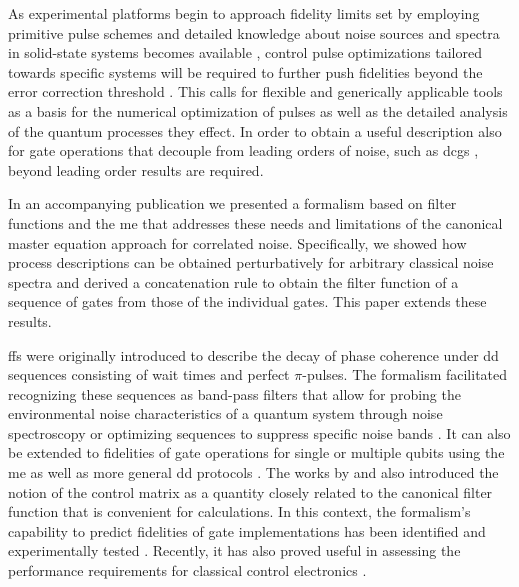 As experimental platforms begin to approach fidelity limits set by employing primitive pulse schemes \cite{Veldhorst2014,Debnath2016,Yoneda2018} and detailed knowledge about noise sources and spectra in solid-state systems becomes available \cite{Dial2013,Quintana2017,Malinowski2017spectroscopy}, control pulse optimizations tailored towards specific systems will be required to further push fidelities beyond the error correction threshold \cite{Barends2014,Blume-kohout2017}. This calls for flexible and generically applicable tools as a basis for the numerical optimization of pulses as well as the detailed analysis of the quantum processes they effect. In order to obtain a useful description also for gate operations that decouple from leading orders of noise, such as \glspl{dcg} \cite{Khodjasteh2009}, beyond leading order results are required.

In an accompanying publication \cite{Cerfontaine2021} we presented a formalism based on filter functions and the \gls{me} that addresses these needs and limitations of the canonical master equation approach for correlated noise. Specifically, we showed how process descriptions can be obtained perturbatively for arbitrary classical noise spectra and derived a concatenation rule to obtain the filter function of a sequence of gates from those of the individual gates. This paper extends these results.

\Glspl{ff} were originally introduced to describe the decay of phase coherence under \gls{dd} sequences \cite{Kofman2001,Martinis2003,Uhrig2007,Cywinski2008} consisting of wait times and perfect $\pi$-pulses. The formalism facilitated recognizing these sequences as band-pass filters that allow for probing the environmental noise characteristics of a quantum system through noise spectroscopy \cite{Alvarez2011,Bylander2011,Paz-Silva2017,Malinowski2017spectroscopy} or optimizing sequences to suppress specific noise bands \cite{Biercuk2009,Uys2009,Soare2014,Malinowski2017}. It can also be extended to fidelities of gate operations for single \cite{Green2012,Green2013} or multiple \cite{Gungordu2018,Ball2020} qubits using the \gls{me} \cite{Magnus1954,Blanes2009} as well as more general \gls{dd} protocols \cite{Paz-Silva2014}. The works by \citeauthor{Green2013} and \citeauthor{Clausen2010} also introduced the notion of the control matrix as a quantity closely related to the canonical filter function that is convenient for calculations. In this context, the formalism's capability to predict fidelities of gate implementations has been identified and experimentally tested \cite{Green2013,Kabytayev2014,Soare2014,Ball2016}. Recently, it has also proved useful in assessing the performance requirements for classical control electronics \cite{VanDijk2018}.

